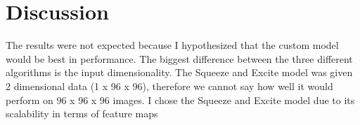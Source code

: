 \documentclass [12pt, letterpaper] {article}
\begin{document}
\section{Discussion}
The results were not expected because I hypothesized that the custom model would be best in performance. The biggest difference between the three different algorithms is the input dimensionality. The Squeeze and Excite model was given 2 dimensional data (1 x 96 x 96), therefore we cannot say how well it would perform on 96 x 96 x 96 images. I chose the Squeeze and Excite model due to its scalability in terms of feature maps
\end{document}
